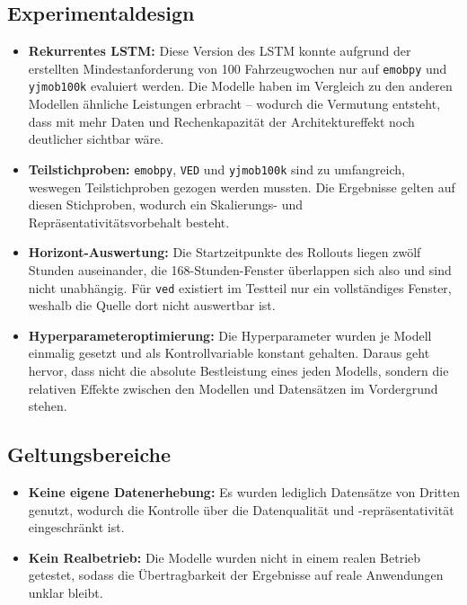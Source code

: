 \subsection*{Experimentaldesign}
\begin{itemize}
    \item \textbf{Rekurrentes LSTM:} Diese Version des LSTM konnte aufgrund der erstellten Mindestanforderung von 100 Fahrzeugwochen nur auf \texttt{emobpy} und \texttt{yjmob100k} evaluiert werden. Die Modelle haben im Vergleich zu den anderen Modellen ähnliche Leistungen erbracht -- wodurch die Vermutung entsteht, dass mit mehr Daten und Rechenkapazität der Architektureffekt noch deutlicher sichtbar wäre.
    \item \textbf{Teilstichproben:} \texttt{emobpy}, \texttt{VED} und \texttt{yjmob100k} sind zu umfangreich, weswegen Teilstichproben gezogen werden mussten. Die Ergebnisse gelten auf diesen Stichproben, wodurch ein Skalierungs- und Repräsentativitätsvorbehalt besteht.
    \item \textbf{Horizont-Auswertung:} Die Startzeitpunkte des Rollouts liegen zwölf Stunden auseinander, die 168-Stunden-Fenster überlappen sich also und sind nicht unabhängig. Für \texttt{ved} existiert im Testteil nur ein vollständiges Fenster, weshalb die Quelle dort nicht auswertbar ist.
    \item \textbf{Hyperparameteroptimierung:} Die Hyperparameter wurden je Modell einmalig gesetzt und als Kontrollvariable konstant gehalten. Daraus geht hervor, dass nicht die absolute Bestleistung eines jeden Modells, sondern die relativen Effekte zwischen den Modellen und Datensätzen im Vordergrund stehen. 
\end{itemize}

\subsection*{Geltungsbereiche}
\begin{itemize}
    \item \textbf{Keine eigene Datenerhebung:} Es wurden lediglich Datensätze von Dritten genutzt, wodurch die Kontrolle über die Datenqualität und -repräsentativität eingeschränkt ist.
    \item \textbf{Kein Realbetrieb:} Die Modelle wurden nicht in einem realen Betrieb getestet, sodass die Übertragbarkeit der Ergebnisse auf reale Anwendungen unklar bleibt.
\end{itemize}

